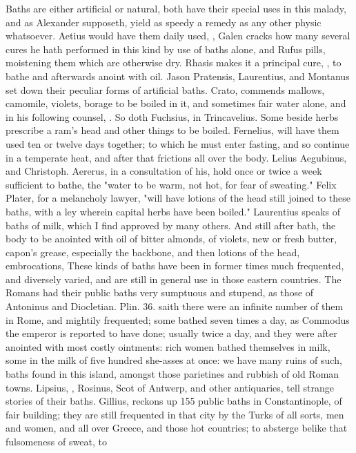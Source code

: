{Baths are either artificial or natural, both have their special uses in this malady, and as Alexander supposeth,  yield as speedy a remedy as any other physic whatsoever. Aetius would have them daily used, ,  Galen cracks how many several cures he hath performed in this kind by use of baths alone, and Rufus pills, moistening them which are otherwise dry. Rhasis makes it a principal cure, , to bathe and afterwards anoint with oil. Jason Pratensis, Laurentius,  and Montanus set down their peculiar forms of artificial baths. Crato,  commends mallows, camomile, violets, borage to be boiled in it, and sometimes fair water alone, and in his following counsel, . So doth Fuchsius,   in Trincavelius. Some beside herbs prescribe a ram's head and other things to be boiled. Fernelius,  will have them used ten or twelve days together; to which he must enter fasting, and so continue in a temperate heat, and after that frictions all over the body. Lelius Aegubinus,  and Christoph. Aererus, in a consultation of his, hold once or twice a week sufficient to bathe, the "water to be warm, not hot, for fear of sweating." Felix Plater,  for a melancholy lawyer, "will have lotions of the head still joined to these baths, with a ley wherein capital herbs have been boiled." Laurentius speaks of baths of milk, which I find approved by many others. And still after bath, the body to be anointed with oil of bitter almonds, of violets, new or fresh butter, capon's grease, especially the backbone, and then lotions of the head, embrocations, \etc{} These kinds of baths have been in former times much frequented, and diversely varied, and are still in general use in those eastern countries. The Romans had their public baths very sumptuous and stupend, as those of Antoninus and Diocletian. Plin. 36. saith there were an infinite number of them in Rome, and mightily frequented; some bathed seven times a day, as Commodus the emperor is reported to have done; usually twice a day, and they were after anointed with most costly ointments: rich women bathed themselves in milk, some in the milk of five hundred she-asses at once: we have many ruins of such, baths found in this island, amongst those parietines and rubbish of old Roman towns. Lipsius, , Rosinus, Scot of Antwerp, and other antiquaries, tell strange stories of their baths. Gillius,  reckons up 155 public baths in Constantinople, of fair building; they are still frequented in that city by the Turks of all sorts, men and women, and all over Greece, and those hot countries; to absterge belike that fulsomeness of sweat, to }
